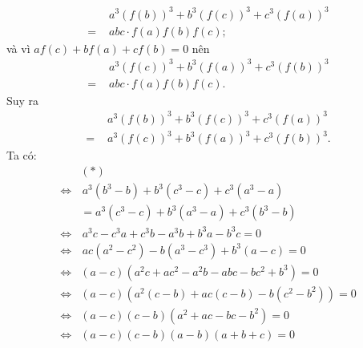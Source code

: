\begin{multicols}{2}
\begin{align*}
		&{a^3}{\left( {f\left( b \right)} \right)^3} + {b^3}{\left( {f\left( c \right)} \right)^3} + {c^3}{\left( {f\left( a \right)} \right)^3} \\[-0.5ex]
		= \,\,&abc \cdot f\left( a \right)f\left( b \right)f\left( c \right);
	\end{align*}
	và vì $af\left( c \right) + bf\left( a \right) + cf\left( b \right) = 0$  nên 
	\begin{align*}
		&{a^3}{\left( {f\left( c \right)} \right)^3} + {b^3}{\left( {f\left( a \right)} \right)^3} + {c^3}{\left( {f\left( b \right)} \right)^3} \\[-0.5ex]
		=\,\,& abc \cdot f\left( a \right)f\left( b \right)f\left( c \right).
	\end{align*}
	Suy ra
	\begin{align*}
		&{a^3}{\left( {f\left( b \right)} \right)^3} + {b^3}{\left( {f\left( c \right)} \right)^3} + {c^3}{\left( {f\left( a \right)} \right)^3}\\[-0.5ex]
		 = \,\,&{a^3}{\left( {f\!\left(c \right)} \!\right)^3} \!+\! {b^3}{\left(\! {f\!\left( a \right)} \!\right)^3} \!+\! {c^3}{\left(\! {f\left( b \right)} \!\right)^3}. \tag{$*$}
	\end{align*}
	Ta có:
	\begin{align*}
		&(*) \\
		\Leftrightarrow&\, {a^3}\left( {{b^3} - b} \right) + {b^3}\left( {{c^3} - c} \right) + {c^3}\left( {{a^3} - a} \right) \\[-0.6ex]
		&= {a^3}( {{c^3} - c}) + {b^3}( {{a^3} - a} ) + {c^3}( {{b^3} - b})\\[-0.6ex]
		\Leftrightarrow&\, {a^3}c - {c^3}a + {c^3}b - {a^3}b + {b^3}a - {b^3}c = 0\\[-0.6ex]
		\Leftrightarrow&\, ac( {{a^2} \!-\! {c^2}} ) \!-\! b( {{a^3} \!-\! {c^3}}) \!+\! {b^3}( {a \!-\! c} ) \!=\! 0\\[-0.6ex]
		\Leftrightarrow& ( \!{a \!-\! c}\!)\!(\! {{a^2}c \!+\! a{c^2} \!-\! {a^2}b \!-\! abc \!-\! b{c^2} \!+\! {b^3}} \!) \!=\! 0\\[-0.6ex]
		\Leftrightarrow &(\! {a \!-\! c}\!)\!(\! {a^2}( {c \!-\! b}\! ) \!+\! ac(\! {c \!-\! b} \!) \!-\! b(\! {{c^2} \!-\! {b^2}}\!)\!) \!=\! 0\\[-0.6ex]
		\Leftrightarrow& \left( {a - c} \right)\left( {c - b} \right)\left( {{a^2} + ac - bc - {b^2}} \right) = 0\\[-0.6ex]
		\Leftrightarrow& \left( {a - c} \right)\left( {c - b} \right)\left( {a - b} \right)\left( {a + b + c} \right) = 0\\[-0.6ex]

\end{align*}
\end{multicols}
